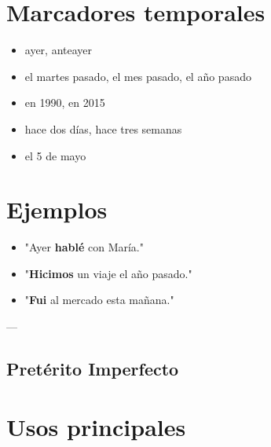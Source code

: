 \documentclass[a4paper,11pt]{article}
\begin{document}
\section{Marcadores temporales}

\begin{itemize}

  \item ayer, anteayer

  \item el martes pasado, el mes pasado, el año pasado

  \item en 1990, en 2015

  \item hace dos días, hace tres semanas

  \item el 5 de mayo

\end{itemize}

\vspace{0.2cm}

\section{Ejemplos}

\begin{itemize}

  \item "Ayer \textbf{hablé} con María."

  \item "\textbf{Hicimos} un viaje el año pasado."

  \item "\textbf{Fui} al mercado esta mañana."

\end{itemize}

\vspace{0.2cm}

---

\vspace{0.2cm}

\subsection{Pretérito Imperfecto}

\vspace{0.2cm}

\section{Usos principales}
\end{document}
